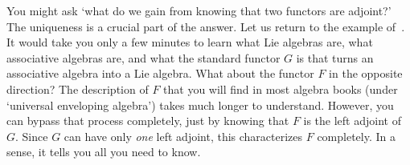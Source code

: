 \begin{remarks}
\begin{enumerate}[(b)]
You might ask `what do we gain from knowing that two functors are adjoint?'
The uniqueness is a crucial part of the answer.  Let us return to the
example of~.  It would take you only a few minutes to
learn what Lie algebras are, what associative algebras are, and what the
standard functor $G$ is that turns an associative algebra into a Lie
algebra.  What about the functor $F$ in the opposite direction?  The
description of $F$ that you will find in most algebra books (under
`universal%
%
%
enveloping algebra') takes much longer to understand.  However, you can
bypass that process completely, just by knowing that $F$ is the left
adjoint of $G$.  Since $G$ can have only \emph{one} left adjoint, this
characterizes $F$ completely.  In a sense, it tells you all you need to
know.%
%
%
%
%
\end{enumerate}
\end{remarks}


